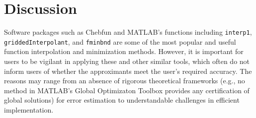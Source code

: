 \documentclass[review]{elsarticle}
\newcommand{\abstol}{\varepsilon}
\theoremstyle{definition}
\newtheorem{exmp}{Example}
\newcommand{\funappxg}{\texttt{funappx\_g}\xspace}
\newcommand{\funming}{\texttt{funmin\_g\xspace}}
\newcommand{\integralg}{\texttt{integral\_g\xspace}}
\begin{document}
\begin{comment}
\begin{exmp}
In this example, we consider the function $f_4(x) = sin(10 \pi x^4) + x$, which
is increasing oscillating over the interval $[0,2]$. We use \funappxg, \funming,
and \integralg to approximate the function, locate its global minimum, and
estimate its integral with $\abstol = 10^{-8}$. With $1,972,359$ points,
\funappxg can approximate $f_4$ uniformly accurate as shown in
Figure~\ref{f4fig}(a). The true global minimum is $(0.6212340312,
-0.3782149854)$ and the absolute approximation error of \funming using
$n=2,022,621$ points is $(1.4\times 10^{-7}, 4.7\times 10^{-11})$. The integral
$\int_{0}^{2} f_4 (x) dx = 2.145517314$ and the approximation error of
\integralg is $4.7\times10^{-10}$ using $4,965,641$ points.

\begin{figure}[bt]
\centering
\texttt{[image: figure/f4\_funappx\_error.eps]} \hspace{-5ex}
\texttt{[image: figure/f4\_funmin\_g.eps]}
\caption{The example $f_4$ with errors of interpolants from \funappxg (left) and
minimum found by \funming (right).}
\label{f4fig}
\end{figure}
\end{exmp}
\end{comment}



\begin{comment}
Our algorithm is readily extensible to the following complex-valued function.
\begin{exmp}
This example is taken from MATLAB's documentation for \texttt{interp1}. Define
the complex valued function $v(x) = 5x + x^2 i$ for $x \in [1,10]$. It is clear
that the real part of $v$ is $5x$ and the imaginary part is $x^2$. We could
apply \funappxg to approximate the two parts separately. However, it is
unnecessary.
\end{exmp}
\end{comment}





\section{Discussion}

Software packages such as Chebfun and MATLAB's functions including
\texttt{interp1}, \texttt{griddedInterpolant}, and \texttt{fminbnd} are some of
the most popular and useful function interpolation and minimization methods.
However, it is important for users to be vigilant in applying these and other
similar tools, which often do not inform users of whether the approximants meet
the user's required accuracy. The reasons may range from an absence of rigorous
theoretical frameworks (e.g., no method in MATLAB's Global Optimizaton Toolbox
provides any certification of global solutions) for error estimation to
understandable challenges in efficient implementation.
\end{document}

